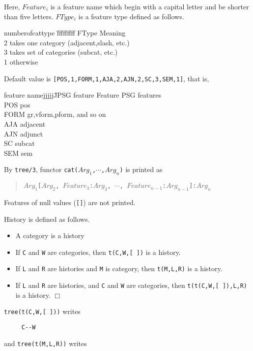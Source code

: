 Here, {\tt $Feature_{i}$} is a feature name which begin with a capital
letter and be shorter than five letters. 
{\tt $FType_{i}$} is a feature type defined as follows.
\begin{tabbing}
numberofcattype \=fffffffff \kill
FType \> Meaning\\
2 \>takes one category (adjacent,slash, etc.)\\
3 \>takes set of categories (subcat, etc.)\\
1 \>otherwise
\end{tabbing}

Default value is {\tt [POS,1,FORM,1,AJA,2,AJN,2,SC,3,SEM,1]}, 
that is, 
\begin{tabbing}
feature namejjjjj\=JPSG feature\kill
Feature \> PSG features\\
POS \>pos\\
FORM \> gr,vform,pform, and so on\\
AJA \>adjacent\\
AJN \>adjunct\\
SC \>subcat\\
SEM \>sem
\end{tabbing}

By {\tt tree/3}, functor {\tt cat($Arg_{1}$,$\cdots$,$Arg_{n}$)} 
is printed as 
\begin{quote}
{\tt $Arg_{1}$[$Arg_{2}$, $Feature_{3}$:$Arg_{3}$, $\cdots$, $Feature_{n-1}$:$Arg_{n-1}$]:$Arg_{n}$}
\end{quote}
Features of null values ({\tt []}) are not printed.

\begin{defs}[History]
History is defined as follows.
\begin{itemize}
\item A category is a history
\item If {\tt C} and {\tt W} are categories, 
then {\tt t(C,W,[ ])} is a history.
\item If {\tt L} and {\tt R} are histories and {\tt M} is category, 
then {\tt t(M,L,R)} is a history. 
\item If {\tt L} and {\tt R} are histories, and {\tt C} and {\tt W} 
are categories, 
then {\tt t(t(C,W,[ ]),L,R)} is a history. 	\hfill $\Box$
\end{itemize}
\end{defs}

{\tt tree(t(C,W,[ ]))} writes
\begin{verbatim}
     C--W
\end{verbatim}
and {\tt tree(t(M,L,R))} writes

